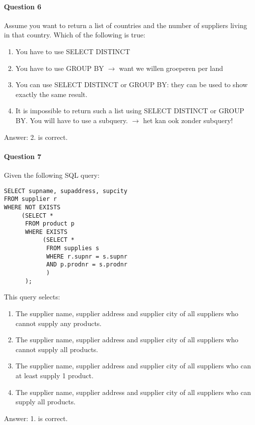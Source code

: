 \documentclass[10pt,a4paper]{report}
\begin{document}
\paragraph{Question 6}
Assume you want to return a list of countries and the number of suppliers living in that country. Which of the following is true:
\begin{enumerate}
\item You have to use SELECT DISTINCT
\item You have to use GROUP BY $\rightarrow$ want we willen groeperen per land
\item You can use SELECT DISTINCT or GROUP BY: they can be used to show exactly the same result.
\item It is impossible to return such a list using SELECT DISTINCT or GROUP BY. You will have to use a subquery. $\rightarrow$ het kan ook zonder subquery!
\end{enumerate}
Answer: 2. is correct.

\paragraph{Question 7}
Given the following SQL query:
\begin{verbatim}
SELECT supname, supaddress, supcity
FROM supplier r
WHERE NOT EXISTS
     (SELECT *
      FROM product p
      WHERE EXISTS 
           (SELECT *
            FROM supplies s
            WHERE r.supnr = s.supnr
            AND p.prodnr = s.prodnr
            )
      );
\end{verbatim}
This query selects:
\begin{enumerate}
\item The supplier name, supplier address and supplier city of all suppliers who cannot supply any products.
\item The supplier name, supplier address and supplier city of all suppliers who cannot supply all products.
\item The supplier name, supplier address and supplier city of all suppliers who can at least supply 1 product.
\item The supplier name, supplier address and supplier city of all suppliers who can supply all products.
\end{enumerate}
Answer: 1. is correct.
\end{document}
